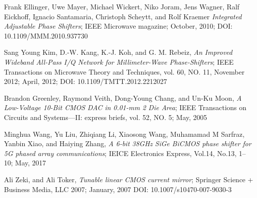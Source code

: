 \documentclass[journal,twocolumn,letterpaper]{IEEEJERM}
\begin{document}
\begin{thebibliography}{9}

	Frank Ellinger, Uwe Mayer, Michael Wickert, Niko Joram, Jens Wagner, Ralf Eickhoff, Ignacio Santamaria, Christoph Scheytt, and Rolf Kraemer
	\textit{Integrated Adjustable Phase Shifters};
	IEEE Microwave magazine;
	October, 2010;
	DOI: 10.1109/MMM.2010.937730

 	Sang Young Kim, D.-W. Kang, K.-J. Koh, and G. M. Rebeiz,
	\textit{An Improved Wideband All-Pass I/Q Network for Millimeter-Wave Phase-Shifters};
	IEEE Transactions on Microwave Theory and Techniques, vol. 60, NO. 11, November 2012;
	April, 2012;
	DOI: 10.1109/TMTT.2012.2212027
    
	Brandon Greenley, Raymond Veith, Dong-Young Chang, and Un-Ku Moon,
	\textit{A Low-Voltage 10-Bit CMOS DAC in 0.01-mm 2 Die Area};
	IEEE Transactions on Circuits and Systems—II: express briefs, vol. 52, NO. 5;
	May, 2005 

	Minghua Wang, Yu Liu, Zhiqiang Li, Xiaosong Wang, Muhamamad M Sarfraz, Yanbin Xiao, and Haiying Zhang, 
	\textit{A 6-bit 38GHz SiGe BiCMOS phase shifter for 5G phased array communications};
	IEICE Electronics Express, Vol.14, No.13, 1–10;
	May, 2017

	Ali Zeki, and Ali Toker,
	\textit{Tunable linear CMOS current mirror};
	Springer Science + Business Media, LLC 2007;
	January, 2007
	DOI: 10.1007/s10470-007-9030-3







    



\end{thebibliography}
\end{document}
